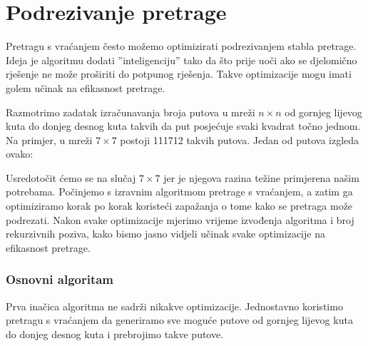 \section{Podrezivanje pretrage}

Pretragu s vraćanjem često možemo optimizirati
podrezivanjem stabla pretrage.
Ideja je algoritmu dodati ''inteligenciju''
tako da što prije uoči
ako se djelomično rješenje ne može proširiti
do potpunog rješenja.
Takve optimizacije mogu imati golem
učinak na efikasnost pretrage.

Razmotrimo zadatak
izračunavanja broja putova
u mreži $n \times n$ od gornjeg lijevog kuta
do donjeg desnog kuta takvih da
put posjećuje svaki kvadrat točno jednom.
Na primjer, u mreži $7 \times 7$
postoji 111712 takvih putova.
Jedan od putova izgleda ovako:

\begin{center}
\end{center}

Usredotočit ćemo se na slučaj $7 \times 7$
jer je njegova razina težine primjerena našim potrebama.
Počinjemo s izravnim algoritmom pretrage s vraćanjem,
a zatim ga optimiziramo korak po korak koristeći zapažanja
o tome kako se pretraga može podrezati.
Nakon svake optimizacije mjerimo vrijeme izvođenja
algoritma i broj rekurzivnih poziva,
kako bismo jasno vidjeli učinak svake
optimizacije na efikasnost pretrage.

\subsubsection{Osnovni algoritam}

Prva inačica algoritma ne sadrži
nikakve optimizacije. Jednostavno koristimo pretragu s vraćanjem da generiramo
sve moguće putove od gornjeg lijevog kuta do
donjeg desnog kuta i prebrojimo takve putove.

